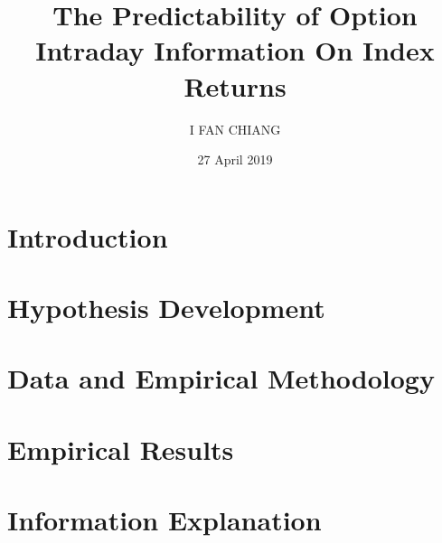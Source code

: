 \documentclass[oneside,12pt]{article}
\title{\textbf{The Predictability of Option Intraday Information On Index Returns}}
\author{I FAN CHIANG}
\date{27 April 2019}
\begin{document}
\maketitle

\begin{abstract}
\centering

\end{abstract}


\fontsize{13pt}{18pt}\selectfont
\section{Introduction}\label{ch:Introduction}



\fontsize{13pt}{18pt}\selectfont
\section{Hypothesis Development}


\fontsize{13pt}{18pt}\selectfont
\section{Data and Empirical Methodology}


\fontsize{13pt}{18pt}\selectfont
\section{Empirical Results}



\fontsize{13pt}{18pt}\selectfont
\section{Information Explanation}



\newpage
\printbibliography
\end{document}

